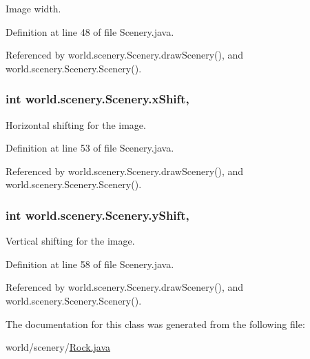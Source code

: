 Image width. 



Definition at line 48 of file Scenery.\-java.



Referenced by world.\-scenery.\-Scenery.\-draw\-Scenery(), and world.\-scenery.\-Scenery.\-Scenery().

\hypertarget{a00024_a0999f105f7630fd67fd9d440da6983aa}{
\subsubsection[{x\-Shift}]{\setlength{\rightskip}{0pt plus 5cm}int world.\-scenery.\-Scenery.\-x\-Shift\hspace{0.3cm}{\ttfamily [protected]}, {\ttfamily [inherited]}}}\label{a00024_a0999f105f7630fd67fd9d440da6983aa}


Horizontal shifting for the image. 



Definition at line 53 of file Scenery.\-java.



Referenced by world.\-scenery.\-Scenery.\-draw\-Scenery(), and world.\-scenery.\-Scenery.\-Scenery().

\hypertarget{a00024_ac9ca2c17cf6920deffe490c013b0e638}{
\subsubsection[{y\-Shift}]{\setlength{\rightskip}{0pt plus 5cm}int world.\-scenery.\-Scenery.\-y\-Shift\hspace{0.3cm}{\ttfamily [protected]}, {\ttfamily [inherited]}}}\label{a00024_ac9ca2c17cf6920deffe490c013b0e638}


Vertical shifting for the image. 



Definition at line 58 of file Scenery.\-java.



Referenced by world.\-scenery.\-Scenery.\-draw\-Scenery(), and world.\-scenery.\-Scenery.\-Scenery().



The documentation for this class was generated from the following file\-:\begin{DoxyCompactItemize}
\item 
world/scenery/\hyperlink{a00068}{Rock.\-java}\end{DoxyCompactItemize}

